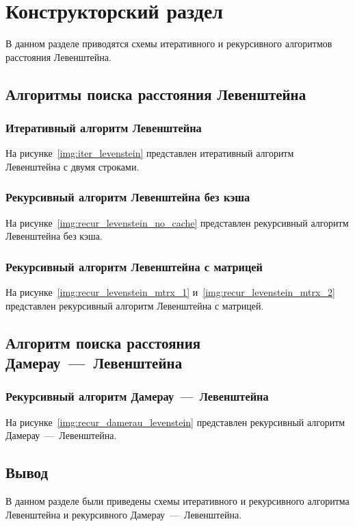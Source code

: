 \chapter{Конструкторский раздел}
В данном разделе приводятся схемы итеративного и рекурсивного алгоритмов расстояния Левенштейна.

\section{Алгоритмы поиска расстояния Левенштейна}
\subsection{Итеративный алгоритм Левенштейна}
На рисунке~\ref{img:iter_levenstein} представлен итеративный алгоритм Левенштейна с двумя строками. 

\subsection{Рекурсивный алгоритм Левенштейна без кэша}
На рисунке~\ref{img:recur_levenstein_no_cache} представлен рекурсивный алгоритм Левенштейна без кэша. 

\subsection{Рекурсивный алгоритм Левенштейна с матрицей}
На рисунке~\ref{img:recur_levenstein_mtrx_1} и~\ref{img:recur_levenstein_mtrx_2} представлен рекурсивный алгоритм Левенштейна с матрицей. 

\section{Алгоритм поиска расстояния Дамерау~---~Левенштейна}
\subsection{Рекурсивный алгоритм Дамерау~---~Левенштейна}
На рисунке~\ref{img:recur_damerau_levenstein} представлен рекурсивный алгоритм Дамерау~---~Левенштейна. 


\section*{Вывод}
В данном разделе были приведены схемы итеративного и рекурсивного алгоритма Левенштейна и рекурсивного Дамерау~---~Левенштейна.
